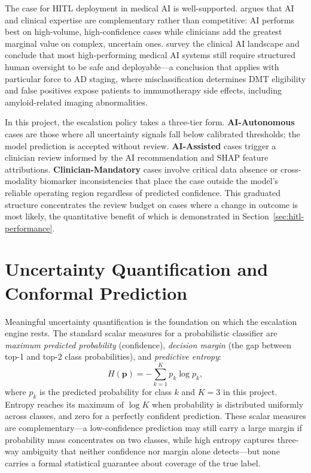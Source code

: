 The case for HITL deployment in medical AI is well-supported.
\citet{topol2019highperformance} argues that AI and clinical expertise are
complementary rather than competitive: AI performs best on high-volume,
high-confidence cases while clinicians add the greatest marginal value on
complex, uncertain ones. \citet{rajpurkar2022ai} survey the clinical AI
landscape and conclude that most high-performing medical AI systems still
require structured human oversight to be safe and deployable---a conclusion that
applies with particular force to AD staging, where misclassification determines
DMT eligibility and false positives expose patients to immunotherapy side
effects, including amyloid-related imaging abnormalities.

In this project, the escalation policy takes a three-tier form.
\textbf{AI-Autonomous} cases are those where all uncertainty signals fall below
calibrated thresholds; the model prediction is accepted without review.
\textbf{AI-Assisted} cases trigger a clinician review informed by the AI
recommendation and SHAP feature attributions. \textbf{Clinician-Mandatory} cases
involve critical data absence or cross-modality biomarker inconsistencies that
place the case outside the model's reliable operating region regardless of
predicted confidence. This graduated structure concentrates the review budget on
cases where a change in outcome is most likely, the quantitative benefit of
which is demonstrated in Section~\ref{sec:hitl-performance}.

\section{Uncertainty Quantification and Conformal Prediction}
\label{sec:uq}

Meaningful uncertainty quantification is the foundation on which the escalation
engine rests. The standard scalar measures for a probabilistic classifier are
\emph{maximum predicted probability} (confidence), \emph{decision margin} (the
gap between top-1 and top-2 class probabilities), and \emph{predictive entropy}:
\begin{equation}
  H(\mathbf{p}) = -\sum_{k=1}^{K} p_k \log p_k,
  \label{eq:entropy}
\end{equation}
where $p_k$ is the predicted probability for class $k$ and $K = 3$ in this
project. Entropy reaches its maximum of $\log K$ when probability is
distributed uniformly across classes, and zero for a perfectly confident
prediction. These scalar measures are complementary---a low-confidence
prediction may still carry a large margin if probability mass concentrates on
two classes, while high entropy captures three-way ambiguity that neither
confidence nor margin alone detects---but none carries a formal statistical
guarantee about coverage of the true label.

